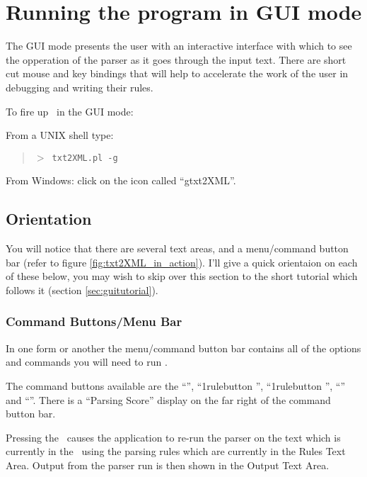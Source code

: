 \section{Running the program in GUI mode} 
\label{sec:gui}

The GUI mode presents the user with an interactive interface with which to 
see the opperation of the parser as it goes through the input text.
There are short cut mouse and key bindings that will help to accelerate 
the work of the user in debugging and writing their rules.

To fire up \program\ in the GUI mode:

From a UNIX shell type:
\begin{quote}
{\tt $>$ txt2XML.pl -g }
\end{quote}

From Windows: click on the icon called ``gtxt2XML''.
 
\subsection{Orientation}

You will notice that there are
several text areas, and a menu/command button bar (refer to figure
\ref{fig:txt2XML_in_action}). I'll give a quick orientaion on each
of these below, you may wish to skip over this section to the short
tutorial which follows it (section \ref{sec:guitutorial}).

\subsubsection{Command Buttons/Menu Bar}
In one form or another the menu/command button bar contains all of
the options and commands you will need to run \program .


The command buttons available are
the ``\runbutton '', ``\forward1rulebutton '', ``\back1rulebutton '', 
``\nexthaltbutton '' and ``\toggleinputchunkviewbutton ''. 
There is a ``Parsing Score'' display on the far right
of the command button bar.

Pressing the \runbutton\ causes the application to re-run the parser on the
text which is currently in the \ using the parsing rules which
are currently in the Rules Text Area. Output from the parser run is then 
shown in the Output Text Area. 

